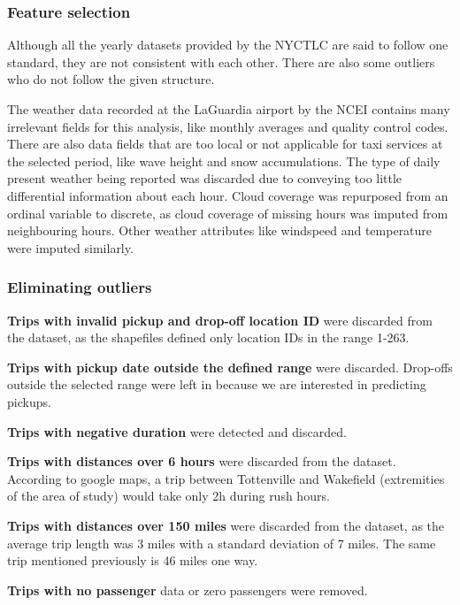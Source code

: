 \documentclass[11pt]{article}
\begin{document}
\subsubsection{Feature selection}

Although all the yearly datasets provided by the NYCTLC are said to follow one standard, they are not consistent with each other. There are also some outliers who do not follow the given structure. 

The weather data recorded at the LaGuardia airport by the NCEI \cite{weatherDataGuide} contains many irrelevant fields for this analysis, like monthly averages and quality control codes. There are also data fields that are too local or not applicable for taxi services at the selected period, like wave height and snow accumulations. The type of daily present weather being reported was discarded due to conveying too little differential information about each hour. Cloud coverage was repurposed from an ordinal variable to discrete, as cloud coverage of missing hours was imputed from neighbouring hours. Other weather attributes like windspeed and temperature were imputed similarly.

\subsubsection{Eliminating outliers}


\textbf{Trips with invalid pickup and drop-off location ID} were discarded from the dataset, as the shapefiles defined only location IDs in the range 1-263.

\textbf{Trips with pickup date outside the defined range} were discarded. Drop-offs outside the selected range were left in because we are interested in predicting pickups.

\textbf{Trips with negative duration} were detected and discarded.

\textbf{Trips with distances over 6 hours} were discarded from the dataset. According to google maps, a trip between Tottenville and Wakefield (extremities of the area of study) would take only 2h during rush hours.

\textbf{Trips with distances over 150 miles} were discarded from the dataset, as the average trip length was 3 miles with a standard deviation of 7 miles. The same trip mentioned previously is 46 miles one way.

\textbf{Trips with no passenger} data or zero passengers were removed.
\end{document}
